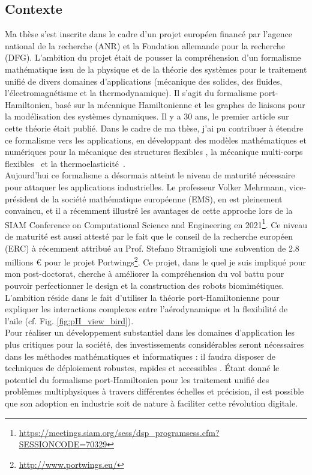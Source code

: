 \documentclass[french]{article}
\begin{document}
\subsection{Contexte}


Ma thèse s'est inscrite dans le cadre d'un projet européen financé par l'agence national de la recherche (ANR) et la Fondation allemande pour la recherche (DFG). L'ambition du projet était de pousser la compréhension d'un formalisme mathématique issu de la physique et de la théorie des systèmes pour le traitement unifié de divers domaines d'applications (mécanique des solides, des fluides, l'électromagnétisme et la thermodynamique). Il s'agit du formalisme port-Hamiltonien, bas\'e sur la mécanique Hamiltonienne et les graphes de liaisons pour la modélisation des systèmes dynamiques. Il y a 30 ans, le premier article sur cette théorie était publié. Dans le cadre de ma thèse, j'ai pu contribuer \`a étendre ce formalisme vers les applications, en développant des modèles mathématiques et numériques pour la mécanique des structures flexibles \cite{brugnoli2019ammmin,brugnoli2019ammkir}, la mécanique multi-corps flexibles~\cite{brugnoli2020msd} et la thermoelasticit\'e~\cite{brugnoli2021ther}. \\

Aujourd'hui ce formalisme a désormais atteint le niveau de maturit\'e nécessaire pour attaquer les applications industrielles. Le professeur Volker Mehrmann, vice-président de la société mathématique européenne (EMS), en est pleinement convaincu, et il a récemment illustré les avantages de cette approche  lors de la SIAM Conference on Computational Science and Engineering en 2021\footnote{\url{https://meetings.siam.org/sess/dsp_programsess.cfm?SESSIONCODE=70329}}. Ce niveau de maturit\'e est aussi attesté par le fait que le conseil de la recherche européen (ERC) \`a récemment attribu\'e au Prof. Stefano Stramigioli une subvention de 2.8 millions \euro{} pour le projet Portwings\footnote{\url{http://www.portwings.eu/}}. Ce projet, dans le quel je suis impliqu\'e pour mon post-doctorat, cherche \`a améliorer la compréhension du vol battu pour pouvoir perfectionner le design et la construction des robots biomimétiques. L'ambition réside dans le fait d'utiliser la théorie port-Hamiltonienne pour expliquer les interactions complexes entre l'aérodynamique et la flexibilit\'e de l'aile (cf. Fig. \ref{fig:pH_view_bird}). \\

Pour réaliser un développement substantiel dans les domaines d'application les plus critiques pour la société, des investissements considérables seront nécessaires dans les méthodes mathématiques et informatiques : il faudra disposer  de techniques de déploiement robustes, rapides et accessibles \cite{niederer2021}. Étant donné le potentiel du formalisme port-Hamiltonien pour les traitement unifié des problèmes multiphysiques \`a travers différentes échelles et précision, il est possible que son adoption en industrie soit de nature \`a faciliter cette révolution digitale. 
\end{document}
